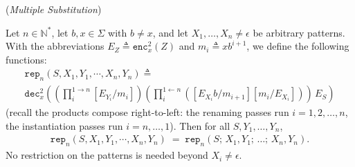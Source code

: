 \documentclass[runningheads,envcountsect]{llncs}
\begin{document}
\begin{theorem}
    (\emph{Multiple Substitution})

    Let $n \in \mathbb{N}^*$, let $b, x \in \Sigma$ with $b \neq x$, and let $X_1, \dots, X_n \neq \epsilon$ be arbitrary patterns. With the abbreviations $E_Z \triangleq \mathtt{enc}^2_{x}(Z)$ and $m_i \triangleq xb^{i+1}$, we define the following functions:
    \begin{multline}
        \mathtt{rep}_n(S, X_1, Y_1, \cdots, X_n, Y_n) \triangleq \\
        \mathtt{dec}^2_{x}\left((\prod_i^{1\rightarrow n} [E_{Y_i}/m_i])(\prod_i^{1\leftarrow n} ([E_{X_i}b/m_{i+1}][m_i/E_{X_i}]))\,E_S\right)
    \end{multline}
    (recall the products compose right-to-left: the renaming passes run $i = 1, 2, \dots, n$, the instantiation passes run $i = n, \dots, 1$). Then for all $S, Y_1, \dots, Y_n$,
    \begin{align}
        \mathtt{rep}_n(S, X_1, Y_1, \cdots, X_n, Y_n) \;=\; \mathtt{rep}_n(S;\, X_1,Y_1;\,\dots;\,X_n,Y_n).
    \end{align}
    No restriction on the patterns is needed beyond $X_i \neq \epsilon$. \label{lem:multiple substitution}
\end{theorem}
\end{document}

